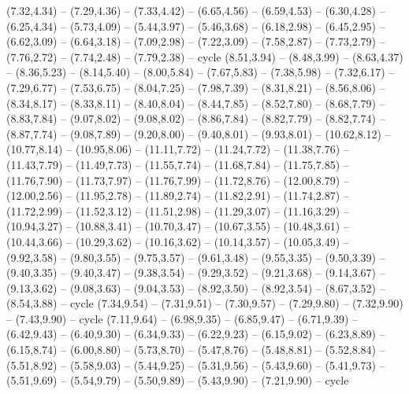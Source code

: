 {(7.32,4.34) -- (7.29,4.36) -- (7.33,4.42) -- (6.65,4.56) -- (6.59,4.53) -- (6.30,4.28) -- (6.25,4.34) -- (5.73,4.09) -- (5.44,3.97) -- (5.46,3.68) -- (6.18,2.98) -- (6.45,2.95) -- (6.62,3.09) -- (6.64,3.18) -- (7.09,2.98) -- (7.22,3.09) -- (7.58,2.87) -- (7.73,2.79) -- (7.76,2.72) -- (7.74,2.48) -- (7.79,2.38) -- cycle}
\expandafter\def\csname geo:gebiet:1938-Poland\endcsname{
  (8.51,3.94) -- (8.48,3.99) -- (8.63,4.37) -- (8.36,5.23) -- (8.14,5.40) -- (8.00,5.84) -- (7.67,5.83) -- (7.38,5.98) -- (7.32,6.17) -- (7.29,6.77) -- (7.53,6.75) -- (8.04,7.25) -- (7.98,7.39) -- (8.31,8.21) -- (8.56,8.06) -- (8.34,8.17) -- (8.33,8.11) -- (8.40,8.04) -- (8.44,7.85) -- (8.52,7.80) -- (8.68,7.79) -- (8.83,7.84) -- (9.07,8.02) -- (9.08,8.02) -- (8.86,7.84) -- (8.82,7.79) -- (8.82,7.74) -- (8.87,7.74) -- (9.08,7.89) -- (9.20,8.00) -- (9.40,8.01) -- (9.93,8.01) -- (10.62,8.12) -- (10.77,8.14) -- (10.95,8.06) -- (11.11,7.72) -- (11.24,7.72) -- (11.38,7.76) -- (11.43,7.79) -- (11.49,7.73) -- (11.55,7.74) -- (11.68,7.84) -- (11.75,7.85) -- (11.76,7.90) -- (11.73,7.97) -- (11.76,7.99) -- (11.72,8.76) -- (12.00,8.79) -- (12.00,2.56) -- (11.95,2.78) -- (11.89,2.74) -- (11.82,2.91) -- (11.74,2.87) -- (11.72,2.99) -- (11.52,3.12) -- (11.51,2.98) -- (11.29,3.07) -- (11.16,3.29) -- (10.94,3.27) -- (10.88,3.41) -- (10.70,3.47) -- (10.67,3.55) -- (10.48,3.61) -- (10.44,3.66) -- (10.29,3.62) -- (10.16,3.62) -- (10.14,3.57) -- (10.05,3.49) -- (9.92,3.58) -- (9.80,3.55) -- (9.75,3.57) -- (9.61,3.48) -- (9.55,3.35) -- (9.50,3.39) -- (9.40,3.35) -- (9.40,3.47) -- (9.38,3.54) -- (9.29,3.52) -- (9.21,3.68) -- (9.14,3.67) -- (9.13,3.62) -- (9.08,3.63) -- (9.04,3.53) -- (8.92,3.50) -- (8.92,3.54) -- (8.67,3.52) -- (8.54,3.88) -- cycle}
\expandafter\def\csname geo:gebiet:1938-Sweden\endcsname{
  (7.34,9.54) -- (7.31,9.51) -- (7.30,9.57) -- (7.29,9.80) -- (7.32,9.90) -- (7.43,9.90) -- cycle
  (7.11,9.64) -- (6.98,9.35) -- (6.85,9.47) -- (6.71,9.39) -- (6.42,9.43) -- (6.40,9.30) -- (6.34,9.33) -- (6.22,9.23) -- (6.15,9.02) -- (6.23,8.89) -- (6.15,8.74) -- (6.00,8.80) -- (5.73,8.70) -- (5.47,8.76) -- (5.48,8.81) -- (5.52,8.84) -- (5.51,8.92) -- (5.58,9.03) -- (5.44,9.25) -- (5.31,9.56) -- (5.43,9.60) -- (5.41,9.73) -- (5.51,9.69) -- (5.54,9.79) -- (5.50,9.89) -- (5.43,9.90) -- (7.21,9.90) -- cycle}
